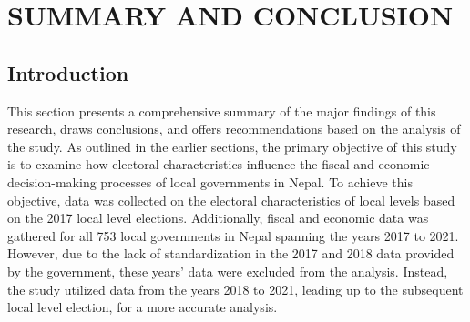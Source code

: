 \newpage 
\section{SUMMARY AND CONCLUSION}
\subsection{Introduction}
This section presents a comprehensive summary of the major findings of this research, draws conclusions, and offers recommendations based on the analysis of the study. As outlined in the earlier sections, the primary objective of this study is to examine how electoral characteristics influence the fiscal and economic decision-making processes of local governments in Nepal. To achieve this objective, data was collected on the electoral characteristics of local levels based on the 2017 local level elections. Additionally, fiscal and economic data was gathered for all 753 local governments in Nepal spanning the years 2017 to 2021. However, due to the lack of standardization in the 2017 and 2018 data provided by the government, these years' data were excluded from the analysis. Instead, the study utilized data from the years 2018 to 2021, leading up to the subsequent local level election, for a more accurate analysis.
